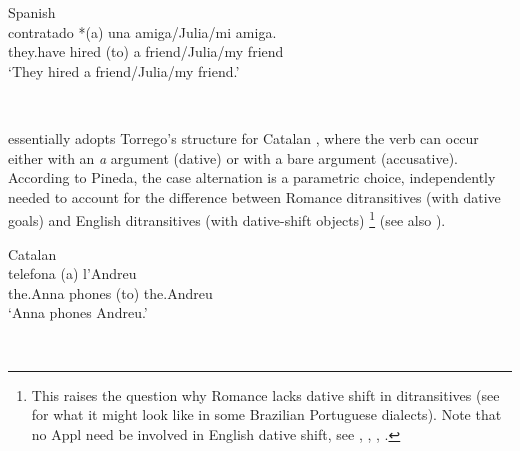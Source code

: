 \documentclass[output=paper]{langscibook}
\begin{document}
\ea\label{ex:manzini:2}
{Spanish \citep{Torrego2010}}\\
     {contratado}  {*(a)} {una} {amiga/Julia/mi} {amiga.}\\
they.have   hired      (to) a friend/Julia/my friend\\
\glt ‘They hired a friend/Julia/my friend.’
\z 

\ea\label{ex:manzini:}
{}\\
\z

\citet[359-360]{Pineda2016} essentially adopts Torrego’s structure for Catalan , where the verb can occur either with an \textit{a} argument (dative) or with a bare argument (accusative). According to Pineda, the case alternation is a parametric choice, independently needed to account for the difference between Romance ditransitives (with dative goals) and English ditransitives (with dative-shift objects){} \footnote{This raises the question why Romance lacks dative shift in ditransitives (see \citet{Salles2016} for what it might look like in some Brazilian Portuguese dialects). Note that no Appl need be involved in English dative shift, see \citet{Kayne1984}, \citet{Pesetsky1995}, \citet{Harley2002}, \citet{BeckJohnson2005}.} (see also \citealt{Pineda2014}).

\ea\label{ex:manzini:}
{Catalan \citep{Pineda2016}}\\
   {telefona}   {(a)} {l’Andreu}\\
the.Anna   phones   (to) the.Andreu\\
\glt ‘Anna phones Andreu.’
  \z

\ea\label{ex:manzini:}
{}\\
\z
\end{document}
